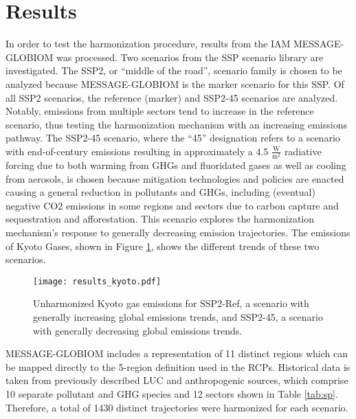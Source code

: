 \section{Results}\label{sec:results}

In order to test the  harmonization procedure, results from the IAM
MESSAGE-GLOBIOM \cite{fricko_marker_2017} was processed. Two scenarios from the
SSP scenario library \cite{Riahi2017153,Rao2017346} are investigated. The SSP2,
or ``middle of the road'', scenario family is chosen to be analyzed because
MESSAGE-GLOBIOM is the marker scenario for this SSP. Of all SSP2 scenarios, the
reference (marker) and SSP2-45 scenarios are analyzed. Notably, emissions from
multiple sectors tend to increase in the reference scenario, thus testing the
harmonization mechanism with an increasing emissions pathway. The SSP2-45
scenario, where the ``45'' designation refers to a scenario with end-of-century
emissions resulting in approximately a 4.5 $\frac{\text{W}}{\text{m}^2}$
radiative forcing due to both warming from GHGs and fluoridated gases as well as
cooling from aerosols, is chosen because mitigation technologies and policies
are enacted causing a general reduction in pollutants and GHGs, including
(eventual) negative CO2 emissions in some regions and sectors due to carbon
capture and sequestration and afforestation. This scenario explores the
harmonization mechanism's response to generally decreasing emission
trajectories. The emissions of Kyoto Gases, shown in Figure \ref{fig:kyoto},
shows the different trends of these two scenarios.


\begin{figure}
  \begin{center}
    \texttt{[image: results\_kyoto.pdf]}
    \caption[]{
      \label{fig:kyoto}
      Unharmonized Kyoto gas emissions for SSP2-Ref, a scenario with generally
      increasing global emissions trends, and SSP2-45, a scenario with generally
      decreasing global emissions trends.  }
  \end{center}
\end{figure}


MESSAGE-GLOBIOM includes a representation of 11 distinct regions which can be
mapped directly to the 5-region definition used in the RCPs. Historical data is
taken from previously described LUC and anthropogenic sources, which comprise 10
separate pollutant and GHG species and 12 sectors shown in Table
% 
% 
\ref{tab:sp}. Therefore, a total of 1430 distinct trajectories were harmonized
for each scenario.

